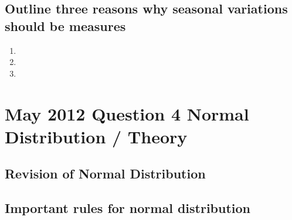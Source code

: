 \documentclass[12pts]{article}
\begin{document}
\subsection*{Outline three reasons why seasonal variations should be measures}
\begin{enumerate}
\item
\item
\item
\end{enumerate}
\newpage
\section*{May 2012 Question 4 Normal Distribution / Theory}

\subsection*{Revision of Normal Distribution}
\subsection{Important rules for normal distribution}
\end{document}
